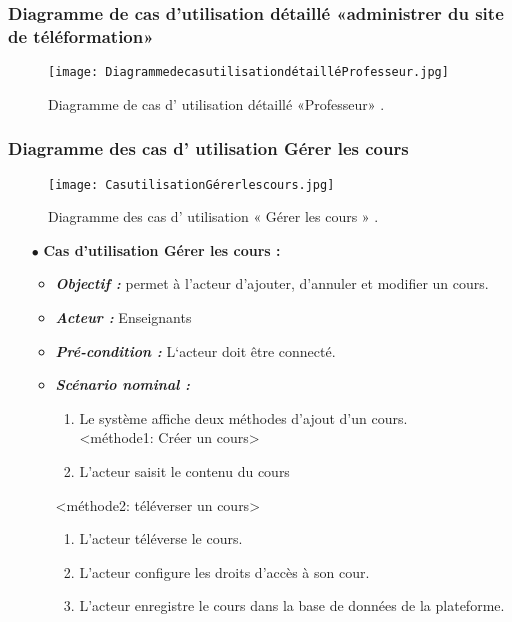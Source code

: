 \subsubsection{Diagramme de cas d’utilisation  détaillé «administrer du site de téléformation» }

\begin{figure}[ht]
	\centering
	\texttt{[image: DiagrammedecasutilisationdétailléProfesseur.jpg]}
	\caption{Diagramme de cas d' utilisation  détaillé «Professeur» .}
	\label{fig:Diagramme de cas d' utilisation  détaillé Professeur  }
\end{figure}
\FloatBarrier

\subsubsection{Diagramme des cas d' utilisation  Gérer les cours }
\begin{figure}[ht]
	\centering
	\texttt{[image: CasutilisationGérerlescours.jpg]}
	\caption{Diagramme des cas d' utilisation « Gérer les cours » .}
	\label{fig:Diagramme des cas d' utilisation  Gérer les cours  }
\end{figure}
\FloatBarrier


\begin{itemize}
	\item[$\bullet$] \textbf{Cas d’utilisation Gérer les cours :}
	\medskip
	\begin{itemize}
		\item \textit{\textbf{Objectif :}}  permet à l’acteur d’ajouter, d’annuler et modifier un cours.
		
		\item \textit{\textbf{Acteur :}} Enseignants
		
		\item \textit{\textbf{Pré-condition :}} L‘acteur doit être connecté.
		\item \textit{\textbf{Scénario nominal   :}}
		\begin{enumerate}
			\item  Le système affiche deux méthodes d’ajout d’un cours.\\
			<méthode1: Créer un cours> 
			\item L’acteur saisit le contenu du cours 
		\end{enumerate}
		<méthode2: téléverser un cours>
		\begin{enumerate}
			\item   L’acteur téléverse le cours.  
			\item  L’acteur configure les droits d’accès à son cour.
			\item  L’acteur enregistre le cours dans la base de données de la plateforme.
		\end{enumerate}
	\end{itemize}
\end{itemize}	
\bigskip



